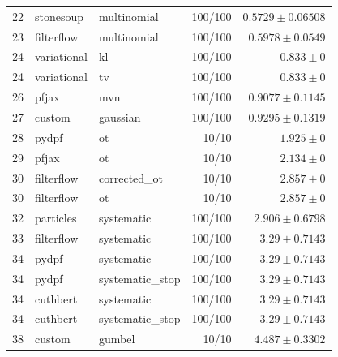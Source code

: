 \begin{table}[!htbp]
\begin{tabular}{rllrr}
22 & stonesoup & multinomial & 100/100 & $0.5729 \pm 0.06508$ \\
23 & filterflow & multinomial & 100/100 & $0.5978 \pm 0.0549$ \\
24 & variational & kl & 100/100 & $0.833 \pm 0$ \\
24 & variational & tv & 100/100 & $0.833 \pm 0$ \\
26 & pfjax & mvn & 100/100 & $0.9077 \pm 0.1145$ \\
27 & custom & gaussian & 100/100 & $0.9295 \pm 0.1319$ \\
28 & pydpf & ot & 10/10 & $1.925 \pm 0$ \\
29 & pfjax & ot & 10/10 & $2.134 \pm 0$ \\
30 & filterflow & corrected\_ot & 10/10 & $2.857 \pm 0$ \\
30 & filterflow & ot & 10/10 & $2.857 \pm 0$ \\
32 & particles & systematic & 100/100 & $2.906 \pm 0.6798$ \\
33 & filterflow & systematic & 100/100 & $3.29 \pm 0.7143$ \\
34 & pydpf & systematic & 100/100 & $3.29 \pm 0.7143$ \\
34 & pydpf & systematic\_stop & 100/100 & $3.29 \pm 0.7143$ \\
34 & cuthbert & systematic & 100/100 & $3.29 \pm 0.7143$ \\
34 & cuthbert & systematic\_stop & 100/100 & $3.29 \pm 0.7143$ \\
38 & custom & gumbel & 10/10 & $4.487 \pm 0.3302$ \\
\bottomrule
\end{tabular}
\end{table}

